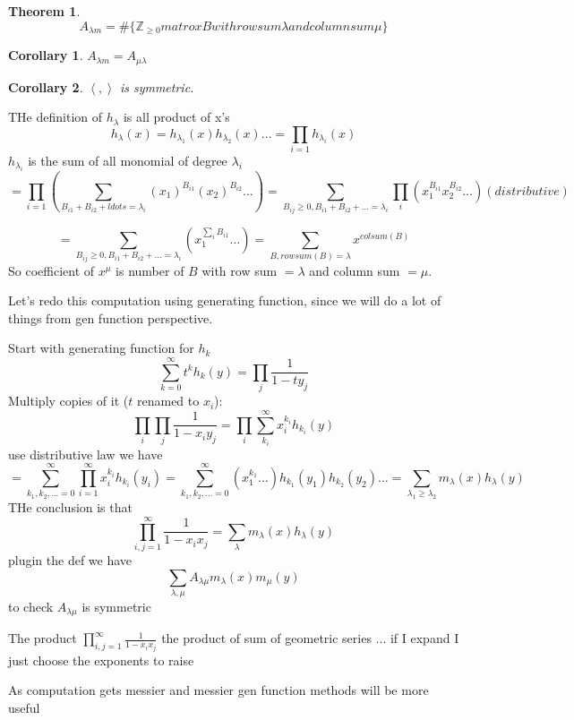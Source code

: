 \documentclass{report}
\newcommand{\Z}{\mathbb{Z}}
\newcommand{\inner}[2]{\left\langle #1, #2\right\rangle}
\newtheorem{theorem}{Theorem}[section]
\newtheorem{corollary}{Corollary}[section]
\theoremstyle{definition}
\theoremstyle{remark}
\numberwithin{equation}{section}
\begin{document}
\begin{theorem}
    \[
        A_{\lambda m} = \# \{\Z_{\geq 0} matrox B with row sum \lambda and column sum \mu\}    
    \]
\end{theorem}
\begin{corollary}
    $A_{\lambda m} = A_{\mu \lambda}$ 
\end{corollary}
\begin{corollary}
    $\inner{}{}$ is symmetric.
\end{corollary}

THe definition of $h_\lambda$ is all product of x's \[
    h_\lambda(x) = h_{\lambda_1}(x)h_{\lambda_2}(x)\ldots  = \prod_{i=1}h_{\lambda_i}(x) 
\]
$h_{\lambda_i}$ is the sum of all monomial of degree $\lambda_i$
\[
    = \prod_{i=1}\left(\sum_{B_{i1} + B_{i2} + ldots = \lambda_i} (x_1)^{B_{i1}}(x_2)^{B_{i2}}\ldots\right) = \sum_{B_{ij} \geq 0, B_{i1} + B_{i2} + \ldots = \lambda_i} \prod_i(x_1^{B_{i1}}x_2^{B_{i2}}\ldots) (distributive)
\]

\[
    = \sum_{B_{ij} \geq 0, B_{i1} + B_{i2} + \ldots = \lambda_i} \left(x_1^{\sum_i B_{i1}}\ldots\right) = \sum_{B, rowsum(B) = \lambda} x^{colsum(B)}
\]
So coefficient of $x^\mu$ is number of $B$ with row sum $=\lambda$ and column sum $=\mu$.

Let's redo this computation using generating function, since we will do a lot of things from gen function perspective.

Start with generating function for $h_k$ \[
    \sum_{k=0}^\infty t^k h_k(y) = \prod_j \frac{1}{1-ty_j}    
\] Multiply copies of it ($t$ renamed to $x_i$):
\[
    \prod_i \prod_j \frac{1}{1-x_iy_j} = \prod_i \sum_{k_i}^\infty x_i^{k_i} h_{k_i}(y)
\] use distributive law we have \[
    = \sum_{k_1, k_2, \ldots = 0}^\infty \prod_{i=1}^\infty x_i^{k_i} h_{k_i}(y_i) = \sum_{k_1, k_2, \ldots = 0}^\infty (x_1^{k_1}\ldots) h_{k_1}(y_1) h_{k_2}(y_2)\ldots =\sum_{\lambda_1 \geq \lambda_2}m_\lambda (x) h_\lambda(y) 
\]
THe conclusion is that \[
    \prod_{i,j = 1}^\infty \frac{1}{1 - x_ix_j} = \sum_{\lambda}m_\lambda(x)h_\lambda(y)   
\]
plugin the def we have \[
    \sum_{\lambda, \mu} A_{\lambda \mu} m_\lambda(x) m_\mu(y)    
\]
to check $A_{\lambda \mu}$ is symmetric

The product $\prod_{i,j = 1}^\infty \frac{1}{1 - x_ix_j}$ the product of sum of geometric series ... if I expand I just choose the exponents to raise

As computation gets messier and messier gen function methods will be more useful
\end{document}
